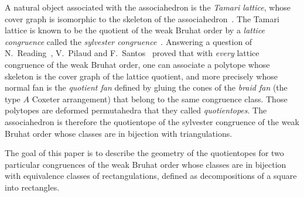 \documentclass{amsart}
\theoremstyle{definition}
\newcommand{\darkblue}{\color{darkblue}} %
\newcommand{\defn}[1]{\textsl{\darkblue #1}} %
\begin{document}
A natural object associated with the associahedron is the \defn{Tamari lattice}, whose cover graph is isomorphic to the skeleton of the associahedron~\cite{MR0146227,MR3235205}.
The Tamari lattice is known to be the quotient of the weak Bruhat order by a \defn{lattice congruence} called the \defn{sylvester congruence}~\cite{MR1654173,MR2142078}.
Answering a question of N.~Reading~\cite{MR2142177}, V.~Pilaud and F.~Santos~\cite{MR3964495} proved that with \emph{every} lattice congruence of the weak Bruhat order, one can associate a polytope whose skeleton is the cover graph of the lattice quotient, and more precisely whose normal fan is the \defn{quotient fan} defined by gluing the cones of the \defn{braid fan} (the type $A$ Coxeter arrangement) that belong to the same congruence class.
Those polytopes are deformed permutahedra that they called \defn{quotientopes}.
The associahedron is therefore the quotientope of the sylvester congruence of the weak Bruhat order whose classes are in bijection with triangulations.

The goal of this paper is to describe the geometry of the quotientopes for two particular congruences of the weak Bruhat order whose classes are in bijection with equivalence classes of rectangulations, defined as decompositions of a square into rectangles.
\end{document}
